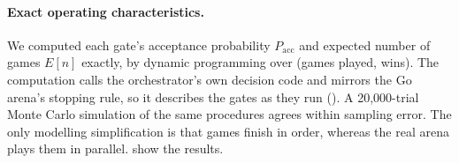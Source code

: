 \paragraph{Exact operating characteristics.}
We computed each gate's acceptance probability $P_{\mathrm{acc}}$ and expected number of
games $E[n]$ exactly, by dynamic programming over (games played, wins). The computation
calls the orchestrator's own decision code and mirrors the Go arena's stopping rule, so it
describes the gates as they run (). A 20{,}000-trial Monte
Carlo simulation of the same procedures agrees within sampling error. The only modelling
simplification is that games finish in order, whereas the real arena plays them in
parallel.  show the results.

\begin{table}[htbp]
\centering
\small

\caption{Exact acceptance probability and expected games for four gates as a function of
the candidate's true advantage. v3 includes the Go arena's interim stops. The v4 columns
use SPRT$(0,\Delta_1)$ with $\alpha=\beta=0.05$: the default configuration ($\Delta_1=35$,
batches of 40, cap 600, $\beta=0.10$) and the free-runner configuration of
\cref{sec:infra-actions} ($\Delta_1=50$, batches of 24, cap 240).}
\label{tab:orch-gate-oc}
\end{table}

